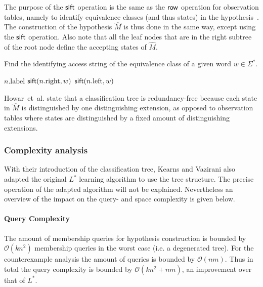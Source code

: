 \documentclass[multi,crop=false,class=article]{standalone}
\begin{document}
The purpose of the $\mathsf{sift}$ operation is the same as the $\mathsf{row}$ operation for
observation tables, namely to identify equivalence classes (and thus states) in
the hypothesis~\cite{Kearns1994}. The construction of the hypothesis $\hat M$ is
thus done in the same way, except using the $\mathsf{sift}$ operation. Also note that
all the leaf nodes that are in the right subtree of the root node define the
accepting states of $\hat M$.

\begin{algorithm}[b]
  \caption{Find the identifying access string of the equivalence class of a
    given word $w \in \Sigma^*$.}
  \label{alg:sift}
  \begin{algorithmic}[1]
     
        \State\Return $n.\text{label}$
      \EndIf
        \State $\mathsf{sift}(n.\text{right},w)$
      \Else
        \State $\mathsf{sift}(n.\text{left},w)$
      \EndIf
    \EndFunction{}
  \end{algorithmic}
\end{algorithm}

Howar~et~al. state that a classification tree is redundancy-free because each
state in $\hat M$ is distinguished by one distinguishing extension, as opposed
to observation tables where states are distinguished by a fixed amount of
distinguishing extensions\cite{Howar2014}.

\subsubsection{Complexity analysis}
\label{sec:complexity-analysis}
With their introduction of the classification tree, Kearns and Vazirani also
adapted the original $L^*$ learning algorithm to use the tree
structure\cite{Kearns1994}. The precise operation of the adapted algorithm will
not be explained. Nevertheless an overview of the impact on the query- and space
complexity is given below.

\paragraph{Query Complexity} The amount of membership queries for hypothesis
construction is bounded by $\mathcal{O}(kn^2)$ membership queries in the
worst case (i.e. a degenerated
tree)\cite{Howar2014,Kearns1994,Isberner2014b}. For the counterexample analysis
the amount of queries is bounded by $\mathcal{O}(nm)$\cite{Kearns1994}. Thus in
total the query complexity is bounded by $\mathcal{O}(kn^2 + nm)$, an
improvement over that of $L^*$.
\end{document}
